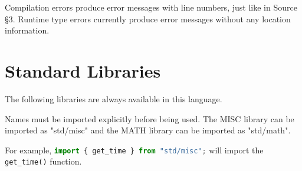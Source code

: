 Compilation errors produce error messages with line numbers, just like in Source \S 3.  Runtime type errors currently produce error messages without any location information.





\newpage























\section{Standard Libraries}

The following libraries are always available in this language.

Names must be imported explicitly before being used.  The MISC library can be imported as "std/misc" and the MATH library can be imported as "std/math".

For example, \lstinline[language=javascript]!import { get_time } from "std/misc";! will import the \lstinline{get_time()} function.







